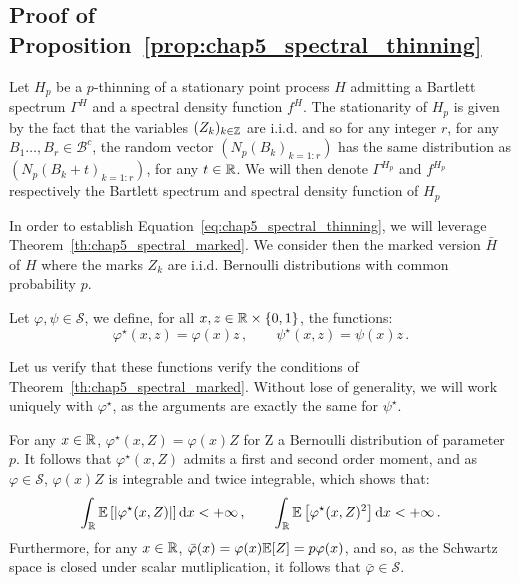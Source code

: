 \begin{subappendices}
    \section{Proof of Proposition~\ref{prop:chap5_spectral_thinning}}\label{appendix:chap5_proof_spectral_thinning}
        Let $H_p$ be a $p$-thinning of a stationary point process $H$ admitting a Bartlett spectrum $\Gamma^H$ and a spectral density function $f^H$.
        The stationarity of $H_p$ is given by the fact that the variables $(Z_k)_{k\in{\mathbb Z}}$ are i.i.d. and so for any integer $r$, 
        for any $B_1\ldots, B_r \in\mathcal{B}^c$, 
        the random vector $(N_p(B_k)_{k=1:r})$ has the same distribution as $(N_p(B_k+t)_{k=1:r})$,
        for any $t\in{\mathbb R}$.
        We will then denote $\Gamma^{H_p}$ and $f^{H_p}$ respectively the Bartlett spectrum and spectral density function of $H_p$

        In order to establish Equation~\eqref{eq:chap5_spectral_thinning}, we will leverage Theorem~\ref{th:chap5_spectral_marked}.
        We consider then the marked version $\bar H$ of $H$ where the marks $Z_k$ are i.i.d. Bernoulli distributions with common probability $p$.

        Let $\varphi, \psi \in \mathcal{S}$, we define, for all $x,z\in{\mathbb R}\times\{0,1\}$, the functions:
        \[\varphi^\star(x,z) = \varphi(x)z\,,\qquad \psi^\star(x,z) = \psi(x)z\,.\]

        Let us verify that these functions verify the conditions of Theorem~\ref{th:chap5_spectral_marked}. 
        Without lose of generality, we will work uniquely with $\varphi^\star$, as the arguments are exactly the same for $\psi^\star$.
        
        For any $x\in{\mathbb R}$, $\varphi^\star(x, Z) = \varphi(x)Z$ for Z a Bernoulli distribution of parameter $p$.
        It follows that $\varphi^\star(x, Z)$ admits a first and second order moment, and as $\varphi\in\mathcal{S}$, 
        $\varphi(x)Z$ is integrable and twice integrable, which shows that:
                \[
                \int_{{\mathbb R}}{{\mathbb E}\left[|\varphi^\star(x, Z)|\right]{\mathrm{d}} x} < +\infty\,,\qquad 
                \int_{{\mathbb R}}{{\mathbb E}\left[\varphi^\star(x, Z)^2\right]{\mathrm{d}} x} < +\infty\,.
                \]
        Furthermore, for any $x\in{\mathbb R}$, $\bar \varphi(x) = \varphi(x){\mathbb E}[Z] = p \varphi(x)$,
        and so, as the Schwartz space is closed under scalar mutliplication, it follows that $\bar \varphi\in\mathcal{S}$.


\end{subappendices}

